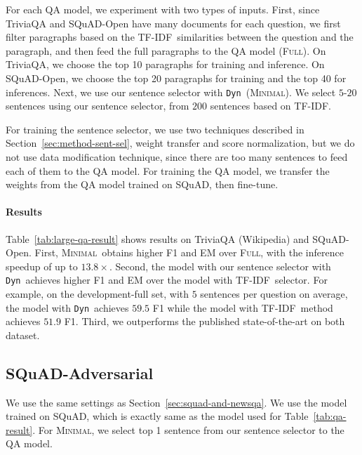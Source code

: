 \documentclass[11pt,a4paper]{article}
\newcommand{\dyn}{{\tt Dyn}}
\newcommand{\full}{\textsc{Full}}
\newcommand{\ours}{\textsc{Minimal}}
\newcommand{\fullshort}{(\textsc{Full})}
\newcommand{\oursshort}{(\textsc{Minimal})}
\newcommand{\tfidf}{TF-IDF}
\begin{document}
 
For each QA model, we experiment with two types of inputs.
First, since TriviaQA and SQuAD-Open have many documents for each question, we first filter paragraphs based on the \tfidf~similarities between the question and the paragraph, and then feed the full paragraphs to the QA model \fullshort.
On TriviaQA, we choose the top 10 paragraphs for training and inference.
On SQuAD-Open, we choose the top 20 paragraphs for training and the top 40 for inferences.
Next, we use our sentence selector with \dyn~\oursshort.
We select $5$-$20$ sentences using our sentence selector, from $200$ sentences based on \tfidf.


For training the sentence selector, we use two techniques described in Section~\ref{sec:method-sent-sel}, weight transfer and score normalization, but we do not use data modification technique, since there are too many sentences to feed each of them to the QA model.
For training the QA model, we transfer the weights from the QA model trained on SQuAD, then fine-tune.


\paragraph{Results}
Table~\ref{tab:large-qa-result} shows results on TriviaQA (Wikipedia) and SQuAD-Open.
First, \ours~obtains higher F1 and EM over \full, with the inference speedup of up to $13.8\times$.
Second, the model with our sentence selector with \dyn~achieves higher F1 and EM over the model with \tfidf~selector.
For example, on the development-full set, with $5$ sentences per question on average, the model with \dyn~achieves $59.5$ F1 while the model with \tfidf~method achieves $51.9$ F1.
Third, we outperforms the published state-of-the-art on both dataset.

\subsection{SQuAD-Adversarial}\label{sec:squad-adv}
We use the same settings as Section~\ref{sec:squad-and-newsqa}.
We use the model trained on SQuAD, which is exactly same as the model used for Table~\ref{tab:qa-result}. For \ours, we select top 1 sentence from our sentence selector to the QA model.
\end{document}
